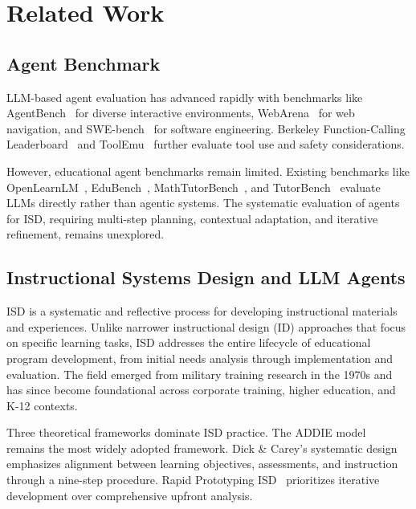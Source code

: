 \section{Related Work}
\label{sec:related-work}

\subsection{Agent Benchmark}
\label{subsec:agent-benchmarks}

LLM-based agent evaluation has advanced rapidly with benchmarks like AgentBench~\cite{liu2023agentbench} for diverse interactive environments, WebArena~\cite{zhou2023webarena} for web navigation, and SWE-bench~\cite{jimenez2024swebench} for software engineering. Berkeley Function-Calling Leaderboard~\cite{yan2024bfcl} and ToolEmu~\cite{ruan2024toolemu} further evaluate tool use and safety considerations.

However, educational agent benchmarks remain limited. Existing benchmarks like OpenLearnLM~\cite{openlearnlm2026}, EduBench~\cite{edubench2025}, MathTutorBench~\cite{mathtutorbench2025}, and TutorBench~\cite{tutorbench2025} evaluate LLMs directly rather than agentic systems. The systematic evaluation of agents for ISD, requiring multi-step planning, contextual adaptation, and iterative refinement, remains unexplored.

\subsection{Instructional Systems Design and LLM Agents}
\label{subsec:isd-benchmarks}

ISD is a systematic and reflective process for developing instructional materials and experiences. Unlike narrower instructional design (ID) approaches that focus on specific learning tasks, ISD addresses the entire lifecycle of educational program development, from initial needs analysis through implementation and evaluation. The field emerged from military training research in the 1970s and has since become foundational across corporate training, higher education, and K-12 contexts.

Three theoretical frameworks dominate ISD practice. The ADDIE model~\cite{branson1975addie} remains the most widely adopted framework. Dick \& Carey's systematic design~\cite{dick1978systematic} emphasizes alignment between learning objectives, assessments, and instruction through a nine-step procedure. Rapid Prototyping ISD~\cite{tripp1990rapid} prioritizes iterative development over comprehensive upfront analysis.

